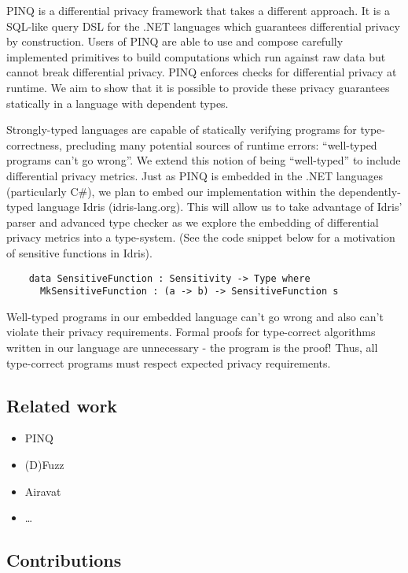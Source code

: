 \documentclass[12pt]{article}
\begin{document}
PINQ is a differential privacy framework that takes a different approach.
It is a SQL-like query DSL for the .NET languages which guarantees differential privacy by construction.
Users of PINQ are able to use and compose carefully implemented primitives to build computations which run against raw data but cannot break differential privacy.
PINQ enforces checks for differential privacy at runtime.
We aim to show that it is possible to provide these privacy guarantees statically in a language with dependent types.

Strongly-typed languages are capable of statically verifying programs for type-correctness, precluding many potential sources of runtime errors: ``well-typed programs can't go wrong''.
We extend this notion of being ``well-typed'' to include differential privacy metrics.
Just as PINQ is embedded in the .NET languages (particularly C\#), we plan to embed our implementation within the dependently-typed language Idris (idris-lang.org).
This will allow us to take advantage of Idris' parser and advanced type checker as we explore the embedding of differential privacy metrics into a type-system.
(See the code snippet below for a motivation of sensitive functions in Idris).

\begin{lstlisting}
    data SensitiveFunction : Sensitivity -> Type where
      MkSensitiveFunction : (a -> b) -> SensitiveFunction s
\end{lstlisting}

Well-typed programs in our embedded language can't go wrong and also can't violate their privacy requirements.
Formal proofs for type-correct algorithms written in our language are unnecessary - the program is the proof!
Thus, all type-correct programs must respect expected privacy requirements.

\subsection{Related work}

\begin{itemize}
  \item PINQ
  \item (D)Fuzz
  \item Airavat
  \item \ldots
\end{itemize}

\subsection{Contributions}
\end{document}
